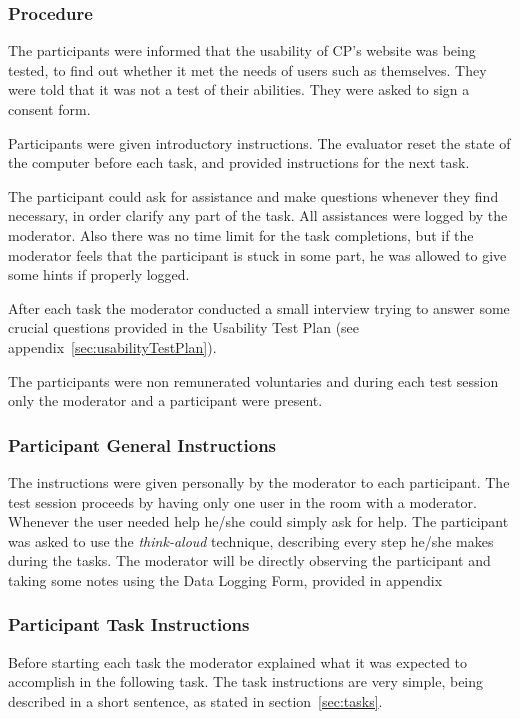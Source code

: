 \documentclass[a4paper]{article}
\begin{document}
\subsubsection{Procedure}

The participants were informed that the usability of CP's website was being tested, to find out whether it met the needs of users such as themselves. They were told that it was not a test of their abilities. They were asked to sign a consent form.

Participants were given introductory instructions. The evaluator reset the state of the computer before each task, and provided instructions for the next task. 

The participant could ask for assistance and make questions whenever they find necessary, in order clarify any part of the task. All assistances were logged by the moderator. Also there was no time limit for the task completions, but if the moderator feels that the participant is stuck in some part, he was allowed to give some hints if properly logged.

After each task the moderator conducted a small interview trying to answer some crucial questions provided in the Usability Test Plan (see appendix~\ref{sec:usabilityTestPlan}).

The participants were non remunerated voluntaries and during each test session only the moderator and a participant were present.

\subsubsection{Participant General Instructions}

The instructions were given personally by the moderator to each participant. The test session proceeds by having only one user in the room with a moderator. Whenever the user needed help he/she could simply ask for help.
 The participant was asked to use the \textit{think-aloud} technique, describing every step he/she makes during the tasks. The moderator will be directly observing the participant and taking some notes using the Data Logging Form, provided in appendix~

\subsubsection{Participant Task Instructions}
Before starting each task the moderator explained what it was expected to accomplish in the following task. The task instructions are very simple, being described in a short sentence, as stated in section~\ref{sec:tasks}.
\end{document}
